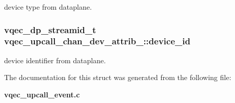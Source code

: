 device type from dataplane. 
\subsubsection{\setlength{\rightskip}{0pt plus 5cm}vqec\_\-dp\_\-streamid\_\-t \bf{vqec\_\-upcall\_\-chan\_\-dev\_\-attrib\_\-::device\_\-id}}\label{structvqec__upcall__chan__dev__attrib___be2ed91103d8db1997028c67c5029eed}


device identifier from dataplane. 

The documentation for this struct was generated from the following file:\begin{CompactItemize}
\item 
\bf{vqec\_\-upcall\_\-event.c}\end{CompactItemize}
